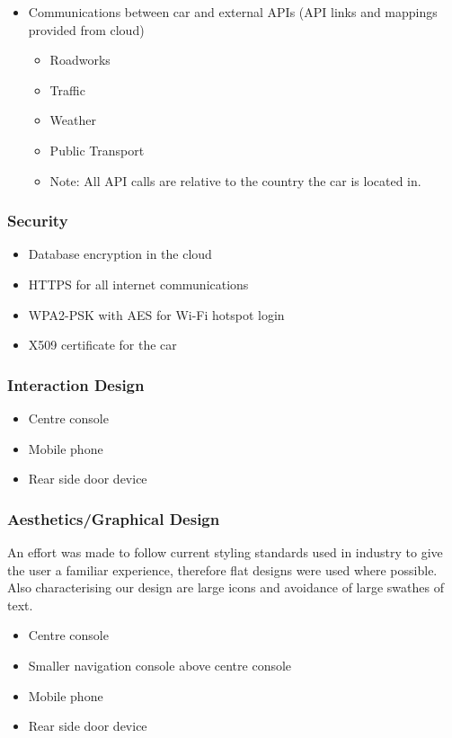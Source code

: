 \documentclass{article}
\begin{document}
\begin{itemize}
	  \item Communications between car and external APIs (API links and mappings provided from cloud)
        \begin{itemize}
        	\item Roadworks
            \item Traffic
            \item Weather
            \item Public Transport
            \item Note: All API calls are relative to the country the car is located in.
        \end{itemize}
	\end{itemize}

\subsubsection{Security}
	\begin{itemize}
		\item Database encryption in the cloud
        \item HTTPS for all internet communications
        \item WPA2-PSK with AES for Wi-Fi hotspot login
        \item X509 certificate for the car

	\end{itemize}

\subsubsection{Interaction Design}
	
	\begin{itemize}
		\item Centre console
        \item Mobile phone
        \item Rear side door device
	\end{itemize}
\subsubsection{Aesthetics/Graphical Design}
    An effort was made to follow current styling standards used in industry to give the user a familiar 	experience, therefore flat designs were used where possible. Also characterising our design are 		large icons and avoidance of large swathes of text.  
    \begin{itemize}
		\item Centre console
        \item Smaller navigation console above centre console
        \item Mobile phone
        \item Rear side door device
	\end{itemize}
\end{document}
